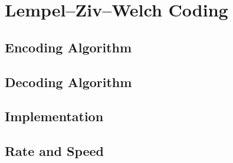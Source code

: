 \documentclass[a4paper, twocolumn]{article}
\begin{document}
    \clearpage
    \section{Lempel--Ziv--Welch Coding} \label{sec:lempel_ziv_welch}
        \subsection{Encoding Algorithm} \label{sec:lzw_encoding_algorithm}
        \subsection{Decoding Algorithm} \label{sec:lzw_decoding_algorithm}
        \subsection{Implementation} \label{sec:lzw_implementation}
        \subsection{Rate and Speed} \label{sec:lzw_rate_and_speed}
\end{document}
